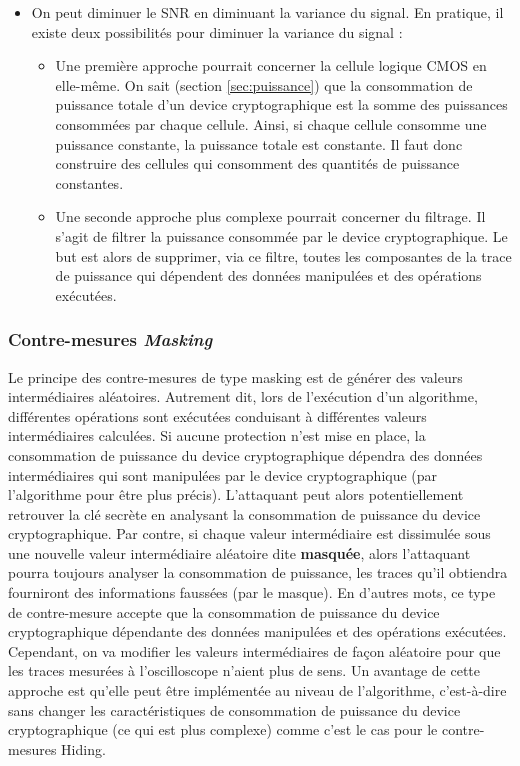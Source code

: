 \documentclass[10pt, oneside, a4paper]{article}
\begin{document}
\begin{itemize}
\begin{itemize}
\item On peut diminuer le SNR en diminuant la variance du signal. En pratique, il existe deux possibilités pour diminuer la variance du signal :
\begin{itemize}
\item Une première approche pourrait concerner la cellule logique CMOS en elle-même. On sait (section \ref{sec:puissance}) que la consommation de puissance totale d'un device cryptographique est la somme des puissances consommées par chaque cellule. Ainsi, si chaque cellule consomme une puissance constante, la puissance totale est constante. Il faut donc construire des cellules qui consomment des quantités de puissance constantes.
\item Une seconde approche plus complexe pourrait concerner du filtrage. Il s'agit de filtrer la puissance consommée par le device cryptographique. Le but est alors de supprimer, via ce filtre, toutes les composantes de la trace de puissance qui dépendent des données manipulées et des opérations exécutées. 
\end{itemize}
\end{itemize}
\end{itemize}







\subsubsection{Contre-mesures \textit{Masking}}
Le principe des contre-mesures de type masking est de générer des valeurs intermédiaires aléatoires. Autrement dit, lors de l'exécution d'un algorithme, différentes opérations sont exécutées conduisant à différentes valeurs intermédiaires calculées. Si aucune protection n'est mise en place, la consommation de puissance du device cryptographique dépendra des données intermédiaires qui sont manipulées par le device cryptographique (par l'algorithme pour être plus précis). L'attaquant peut alors potentiellement retrouver la clé secrète en analysant la consommation de puissance du device cryptographique. Par contre, si chaque valeur intermédiaire est dissimulée sous une nouvelle valeur intermédiaire aléatoire dite \textbf{masquée}, alors l'attaquant pourra toujours analyser la consommation de puissance, les traces qu'il obtiendra fourniront des informations faussées (par le masque). En d'autres mots, ce type de contre-mesure accepte que la consommation de puissance du device cryptographique dépendante des données manipulées et des opérations exécutées. Cependant, on va modifier les valeurs intermédiaires de façon aléatoire pour que les traces mesurées à l'oscilloscope n'aient plus de sens. Un avantage de cette approche est qu'elle peut être implémentée au niveau de l'algorithme, c'est-à-dire sans changer les caractéristiques de consommation de puissance du device cryptographique (ce qui est plus complexe) comme c'est le cas pour le contre-mesures Hiding.
\end{document}
